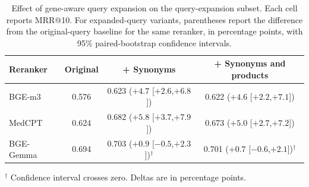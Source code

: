 \documentclass[runningheads]{llncs}
\begin{document}
\begin{table}[H]
\centering
\caption{Effect of gene-aware query expansion on the query-expansion subset. Each cell reports MRR@10. For expanded-query variants, parentheses report the difference from the original-query baseline for the same reranker, in percentage points, with 95\% paired-bootstrap confidence intervals.}
\label{tab:s1_qe_reranker}
\scriptsize
\setlength{\tabcolsep}{6pt}
\begin{tabular}{@{}l c c c@{}}
\toprule
Reranker & Original & + Synonyms & + Synonyms and products \\
\midrule
BGE-m3 & 0.576 & 0.623 ($+4.7$ [$+2.6$,$+6.8$]) & 0.622 ($+4.6$ [$+2.2$,$+7.1$]) \\
MedCPT & 0.624 & 0.682 ($+5.8$ [$+3.7$,$+7.9$]) & 0.673 ($+5.0$ [$+2.7$,$+7.2$]) \\
BGE-Gemma & 0.694 & 0.703 ($+0.9$ [$-0.5$,$+2.3$])$^{\dag}$ & 0.701 ($+0.7$ [$-0.6$,$+2.1$])$^{\dag}$ \\
\bottomrule
\end{tabular}

\vspace{1mm}
{\scriptsize $^{\dag}$ Confidence interval crosses zero. Deltas are in percentage points.}
\end{table}
\end{document}
